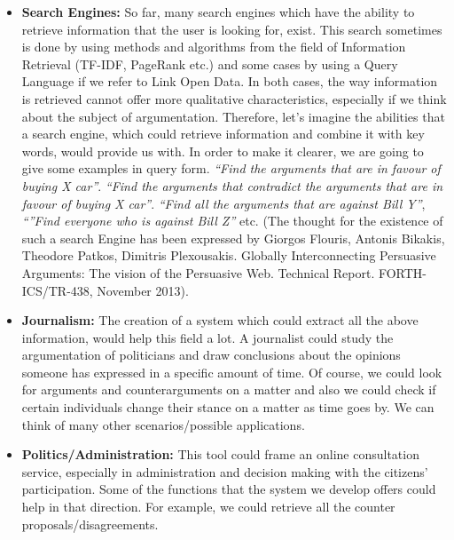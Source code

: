 \begin{itemize}

	\item \textbf{Search Engines:} So far, many search engines which have the ability to retrieve information that the user is looking for, exist. This search sometimes is done by using methods and algorithms from the field of Information Retrieval (TF-IDF, PageRank etc.) and some cases by using a Query Language if we refer to Link Open Data. In both cases, the way information is retrieved cannot offer more qualitative characteristics, especially if we think about the subject of argumentation. Therefore, let's imagine the abilities that a search engine, which could retrieve information and combine it with key words, would  provide us with. In order to make it clearer, we are going to give some examples in query form. \textit{``Find the arguments that are in favour of buying X car''}. \textit{``Find the arguments that contradict the arguments that are in favour of buying X car''}. \textit{``Find all the arguments that are against Bill Y''}, \textit{``''Find everyone who is against Bill Z''} etc. (The thought for the existence of such a search Engine has been expressed by Giorgos Flouris, Antonis Bikakis, Theodore Patkos, Dimitris Plexousakis. Globally Interconnecting Persuasive Arguments: The vision of the Persuasive Web. Technical Report. FORTH-ICS/TR-438, November 2013).
	\item \textbf{Journalism:} The creation of a system which could extract all the above information, would help this field a lot. A journalist could study the argumentation of politicians and draw conclusions about the opinions someone has expressed  in a specific amount of time. Of course, we could look for arguments and counterarguments on a matter and also we could check if certain individuals change their stance on a matter as time goes by. We can think of many other scenarios/possible applications.
	\item \textbf{Politics/Administration:} This tool could frame an online consultation service, especially in administration and decision making with the citizens' participation. Some of the functions that the system we develop offers could help in that direction. For example, we could retrieve all the counter proposals/disagreements.\\

\end{itemize}

